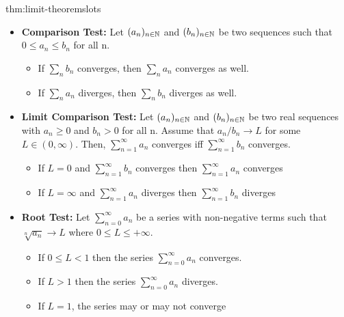 \documentclass[landscape, 8pt]{extarticle}
\begin{document}
\begin{multicols}{3}
\begin{thm}{thm:limit-theorems}{lots}
\begin{itemize}
    \item \textbf{Comparison Test:} Let $(a_n)_{n\in\mathbb{N}}$ and $(b_n)_{n\in\mathbb{N}}$ be two sequences such that $0\leq a_n\leq b_n$ for all n.
    \renewcommand\labelitemi{\tiny$\bullet$}
    \vspace{-5pt}
    \begin{itemize}
        \setlength\itemsep{0em}
        \item If $\sum_n b_n$ converges, then $\sum_n a_n$ converges as well.
        \item If $\sum_n a_n$ diverges, then $\sum_n b_n$ diverges as well.
    \end{itemize}
    \vspace{-5pt}

    \item \textbf{Limit Comparison Test:} Let $(a_n)_{n\in\mathbb{N}}$ and $(b_n)_{n\in\mathbb{N}}$ be two real sequences with $a_n\geq0$ and $b_n > 0$ for all n. Assume that $a_n / b_n \to L$ for some $L\in(0,\infty)$. Then, $\sum_{n=1}^{\infty}  a_n$ converges iff $\sum_{n=1}^{\infty}  b_n$ converges. 
    \renewcommand\labelitemi{\tiny$\bullet$}
    \vspace{-5pt}
    \begin{itemize}
        \setlength\itemsep{0em}
        \item If $L=0$ and $\sum_{n=1}^{\infty}b_{n}$ converges then $\sum_{n=1}^{\infty} a_{n}$ converges
        \item If $L=\infty$ and $\sum_{n=1}^{\infty}a_{n}$ diverges then $\sum_{n=1}^{\infty} b_{n}$ diverges
    \end{itemize}
    \vspace{-5pt}
    
    \item \textbf{Root Test:} Let $\sum_{n=0}^{\infty} a_n$ be a series with non-negative terms such that $\sqrt[n]{a_n} \to L$ where $0 \le L \le +\infty$.
    \renewcommand\labelitemi{\tiny$\bullet$}
    \vspace{-5pt}
    \begin{itemize}
        \setlength\itemsep{0em}
        \item If $0\le L < 1$ then the series $\sum_{n=0}^{\infty}  a_n$ converges.
        \item If $L > 1$ then the series $\sum_{n=0}^{\infty}  a_n$ diverges.
        \item If $L = 1$, the series may or may not converge
    \end{itemize}
    \vspace{-5pt}


\end{itemize}
\end{thm}
\end{multicols}
\end{document}
